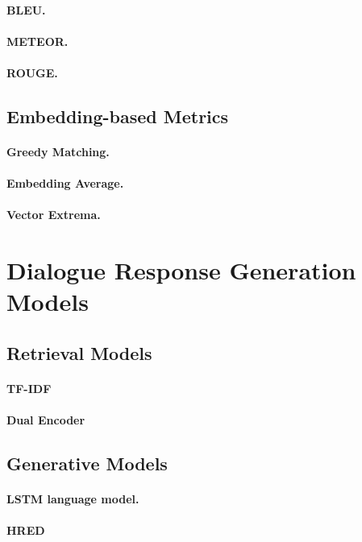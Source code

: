 \documentclass[runningheads]{llncs}
\begin{document}
\paragraph{BLEU.}
\paragraph{METEOR.}
\paragraph{ROUGE.}

\subsection{Embedding-based Metrics}
\paragraph{Greedy Matching.}
\paragraph{Embedding Average.}
\paragraph{Vector Extrema.}


\section{Dialogue Response Generation Models}
\subsection{Retrieval Models}
\paragraph{TF-IDF}
\paragraph{Dual Encoder}

\subsection{Generative Models}
\paragraph{LSTM language model.}
\paragraph{HRED}
\end{document}
